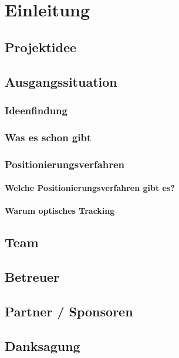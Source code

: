 \chapter{Einleitung}
\renewcommand{\kapitelautor}{}

\section{Projektidee}

\section{Ausgangssituation}

  \subsection{Ideenfindung}

  \subsection{Was es schon gibt}

  \subsection{Positionierungsverfahren}

    \subsubsection{Welche Positionierungsverfahren gibt es?}

    \subsubsection{Warum optisches Tracking}

\section{Team}

\section{Betreuer}

\section{Partner / Sponsoren}

\section{Danksagung}

